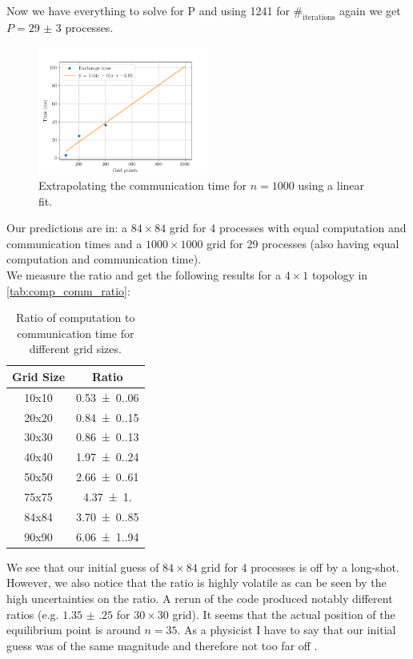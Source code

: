 Now we have everything to solve for P and using 1241 for $\#_\text{{iterations}}$ again we get $P = \num{29(3)}$ processes. 
\begin{figure}[H]
    \centering
    \includegraphics[width=0.5\textwidth]{../fig/lab2/estimate25_stencil.png}
    \caption{Extrapolating the communication time for $n=1000$ using a linear fit.}
    \label{fig:comp_sencil_extra}
\end{figure}

Our predictions are in: a $84\times84$ grid for 4 processes with equal computation and communication times and a $1000\times1000$ grid for 29 processes (also having equal computation and communication time).\\
We measure the ratio  and get the following results for a $4\times1$ topology in \autoref{tab:comp_comm_ratio}:

\begin{table}[H]
    \centering
    \caption{Ratio of computation to communication time for different grid sizes.}
    \label{tab:comp_comm_ratio}
    \begin{tabular}{|c|S[table-format=1.2(1.2)]|}
        \hline
        {{{Grid Size}}} & {Ratio} \\\hline
        10x10 & \num{0.53(0.06)} \\\hline
        20x20 & \num{0.84(0.15)} \\\hline
        30x30 & \num{0.86(0.13)} \\\hline
        40x40 & \num{1.97(0.24)} \\\hline
        50x50 & \num{2.66(0.61)} \\\hline
        75x75 & \num{4.37(1.00)} \\\hline
        84x84 & \num{3.70(0.85)} \\\hline
        90x90 & \num{6.06(1.94)} \\\hline
    \end{tabular}
\end{table}
We see that our initial guess of $84\times84$ grid for 4 processes is off by a long-shot. However, we also notice that the ratio is highly volatile as can be seen by the high uncertainties on the ratio. A rerun of the code produced notably different ratios (e.g. $\num{1.35(25)}$ for $30\times30$ grid). It seems that the actual position of the equilibrium point is around $n=35$. As a physicist I have to say that our initial guess was of the same magnitude and therefore not too far off \smiley.\\

